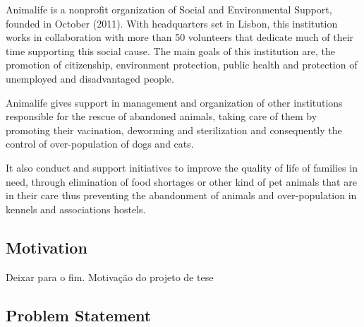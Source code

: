 


Animalife is a nonprofit organization of Social and Environmental Support, founded in October (2011). With headquarters set in Lisbon, this institution works in collaboration with more than 50 volunteers that dedicate much of their time supporting this social cause. The main goals of this institution are, the promotion of citizenship, environment protection, public health and protection of unemployed and disadvantaged people.

Animalife gives support in management and organization of other institutions responsible for the rescue of abandoned animals, taking care of them by promoting their vacination, deworming and sterilization and consequently the control of over-population of dogs and cats. 

It also conduct and support initiatives to improve the quality of life of families in need, through elimination of food shortages or other kind of pet animals that are in their care thus preventing the abandonment of animals and over-population in kennels and associations hostels.

\subsection{Motivation}\label{sec:related}
Deixar para o fim. Motivação do projeto de tese

\subsection{Problem Statement}\label{sec:related}

